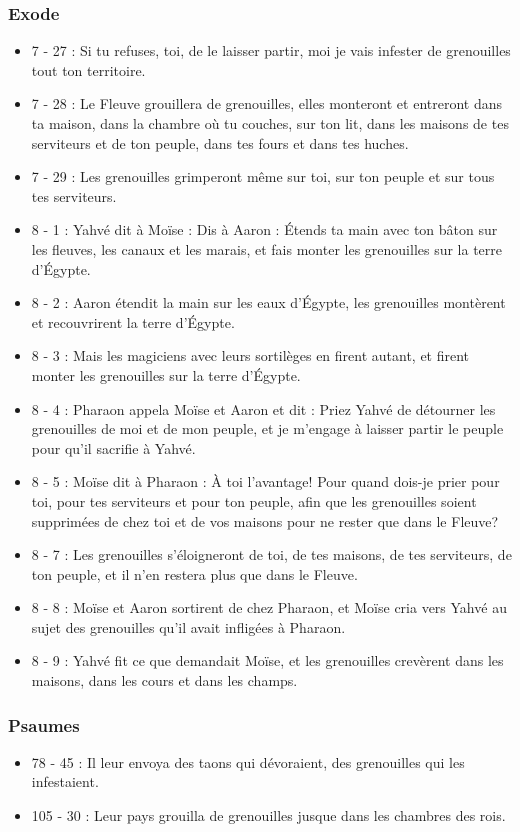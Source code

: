 \subsubsection{Exode}
\begin{itemize}
\item 7 - 27 : Si tu refuses, toi, de le laisser partir, moi je vais infester de grenouilles tout ton territoire.
\item 7 - 28 : Le Fleuve grouillera de grenouilles, elles monteront et entreront dans ta maison, dans la chambre où tu couches, sur ton lit, dans les maisons de tes serviteurs et de ton peuple, dans tes fours et dans tes huches.
\item 7 - 29 : Les grenouilles grimperont même sur toi, sur ton peuple et sur tous tes serviteurs.
\item 8 - 1 : Yahvé dit à Moïse : Dis à Aaron : Étends ta main avec ton bâton sur les fleuves, les canaux et les marais, et fais monter les grenouilles sur la terre d'Égypte.
\item 8 - 2 : Aaron étendit la main sur les eaux d'Égypte, les grenouilles montèrent et recouvrirent la terre d'Égypte.
\item 8 - 3 : Mais les magiciens avec leurs sortilèges en firent autant, et firent monter les grenouilles sur la terre d'Égypte.
\item 8 - 4 : Pharaon appela Moïse et Aaron et dit : Priez Yahvé de détourner les grenouilles de moi et de mon peuple, et je m'engage à laisser partir le peuple pour qu'il sacrifie à Yahvé.
\item 8 - 5 : Moïse dit à Pharaon : À toi l'avantage! Pour quand dois-je prier pour toi, pour tes serviteurs et pour ton peuple, afin que les grenouilles soient supprimées de chez toi et de vos maisons pour ne rester que dans le Fleuve?
\item 8 - 7 : Les grenouilles s'éloigneront de toi, de tes maisons, de tes serviteurs, de ton peuple, et il n'en restera plus que dans le Fleuve.
\item 8 - 8 : Moïse et Aaron sortirent de chez Pharaon, et Moïse cria vers Yahvé au sujet des grenouilles qu'il avait infligées à Pharaon.
\item 8 - 9 : Yahvé fit ce que demandait Moïse, et les grenouilles crevèrent dans les maisons, dans les cours et dans les champs.
\end{itemize}
\subsubsection{Psaumes}
\begin{itemize}
\item 78 - 45 : Il leur envoya des taons qui dévoraient, des grenouilles qui les infestaient.
\item 105 - 30 : Leur pays grouilla de grenouilles jusque dans les chambres des rois.
\end{itemize}

